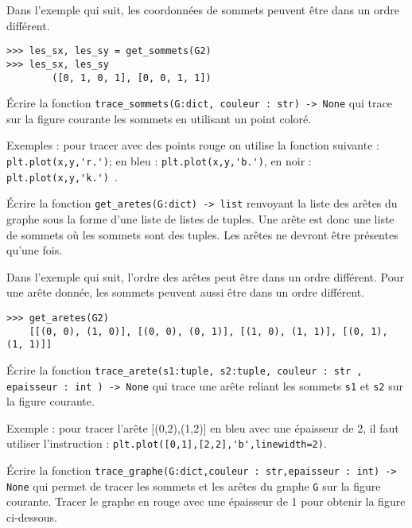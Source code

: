 \begin{exemple}
Dans l'exemple qui suit, les coordonnées de sommets peuvent être dans un ordre différent. 
\begin{lstlisting}
>>> les_sx, les_sy = get_sommets(G2)
>>> les_sx, les_sy
        ([0, 1, 0, 1], [0, 0, 1, 1])
\end{lstlisting}
\end{exemple}


\begin{question}
Écrire la fonction \lstinline{trace_sommets(G:dict, couleur : str) -> None} qui trace sur la figure courante les sommets en utilisant un point coloré.

Exemples : pour tracer avec des points rouge on utilise la fonction suivante : \lstinline{plt.plot(x,y,'r.')};  en bleu : \lstinline{plt.plot(x,y,'b.')}, en noir : \lstinline{plt.plot(x,y,'k.') }.
\end{question}

\begin{question}
Écrire la fonction \lstinline{get_aretes(G:dict) -> list} renvoyant la liste des arêtes du graphe sous la forme d'une liste de listes de tuples. Une arête est donc une liste de sommets où les sommets sont des tuples. Les arêtes ne devront être présentes qu'une fois.
\end{question}

\begin{exemple}
Dans l'exemple qui suit, l'ordre des arêtes peut être dans un ordre différent. Pour une arête donnée, les sommets peuvent aussi être dans un ordre différent.
\begin{lstlisting}
>>> get_aretes(G2)
	[[(0, 0), (1, 0)], [(0, 0), (0, 1)], [(1, 0), (1, 1)], [(0, 1), (1, 1)]]
\end{lstlisting}
\end{exemple}

\begin{question}
Écrire la fonction \lstinline{trace_arete(s1:tuple, s2:tuple, couleur : str , epaisseur : int ) -> None} qui trace une arête reliant les sommets \lstinline{s1} et \lstinline{s2} sur la figure courante. 

Exemple : pour tracer l'arête [(0,2),(1,2)] en bleu avec une épaisseur de 2, il faut utiliser l'instruction : \lstinline{plt.plot([0,1],[2,2],'b',linewidth=2)}.
\end{question}


\begin{question}
Écrire la fonction \lstinline{trace_graphe(G:dict,couleur : str,epaisseur : int) -> None} qui permet de tracer les sommets et les arêtes du graphe \lstinline{G} sur la figure courante. Tracer le graphe en rouge avec une épaisseur de 1 pour obtenir la figure ci-dessous.
\end{question}

